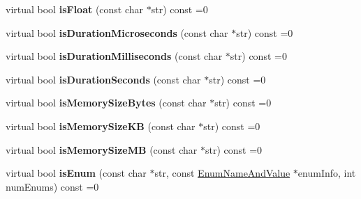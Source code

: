 \begin{DoxyCompactItemize}
\item 
\hypertarget{classCONFIG4CPP__NAMESPACE_1_1Configuration_a33e20bf019112adf8a96e1777ce535fc}{virtual bool {\bfseries is\-Float} (const char $\ast$str) const =0}\label{classCONFIG4CPP__NAMESPACE_1_1Configuration_a33e20bf019112adf8a96e1777ce535fc}

\item 
\hypertarget{classCONFIG4CPP__NAMESPACE_1_1Configuration_af54efe6873b6047cfea57c1e478853c0}{virtual bool {\bfseries is\-Duration\-Microseconds} (const char $\ast$str) const =0}\label{classCONFIG4CPP__NAMESPACE_1_1Configuration_af54efe6873b6047cfea57c1e478853c0}

\item 
\hypertarget{classCONFIG4CPP__NAMESPACE_1_1Configuration_ab31031ad55a6b9cc2e7081d3d81b6785}{virtual bool {\bfseries is\-Duration\-Milliseconds} (const char $\ast$str) const =0}\label{classCONFIG4CPP__NAMESPACE_1_1Configuration_ab31031ad55a6b9cc2e7081d3d81b6785}

\item 
\hypertarget{classCONFIG4CPP__NAMESPACE_1_1Configuration_a6655a4960b5998c9ca22eff7960f6ecb}{virtual bool {\bfseries is\-Duration\-Seconds} (const char $\ast$str) const =0}\label{classCONFIG4CPP__NAMESPACE_1_1Configuration_a6655a4960b5998c9ca22eff7960f6ecb}

\item 
\hypertarget{classCONFIG4CPP__NAMESPACE_1_1Configuration_aef8085f40dd1764bd202b27638632547}{virtual bool {\bfseries is\-Memory\-Size\-Bytes} (const char $\ast$str) const =0}\label{classCONFIG4CPP__NAMESPACE_1_1Configuration_aef8085f40dd1764bd202b27638632547}

\item 
\hypertarget{classCONFIG4CPP__NAMESPACE_1_1Configuration_a153533d8400d62fa5923c86c61a778f4}{virtual bool {\bfseries is\-Memory\-Size\-K\-B} (const char $\ast$str) const =0}\label{classCONFIG4CPP__NAMESPACE_1_1Configuration_a153533d8400d62fa5923c86c61a778f4}

\item 
\hypertarget{classCONFIG4CPP__NAMESPACE_1_1Configuration_ac9dd169927020ccda8a8b8bea723a852}{virtual bool {\bfseries is\-Memory\-Size\-M\-B} (const char $\ast$str) const =0}\label{classCONFIG4CPP__NAMESPACE_1_1Configuration_ac9dd169927020ccda8a8b8bea723a852}

\item 
\hypertarget{classCONFIG4CPP__NAMESPACE_1_1Configuration_ad9cf0942d78dfda6871221911b43e645}{virtual bool {\bfseries is\-Enum} (const char $\ast$str, const \hyperlink{structCONFIG4CPP__NAMESPACE_1_1EnumNameAndValue}{Enum\-Name\-And\-Value} $\ast$enum\-Info, int num\-Enums) const =0}\label{classCONFIG4CPP__NAMESPACE_1_1Configuration_ad9cf0942d78dfda6871221911b43e645}


\end{DoxyCompactItemize}

